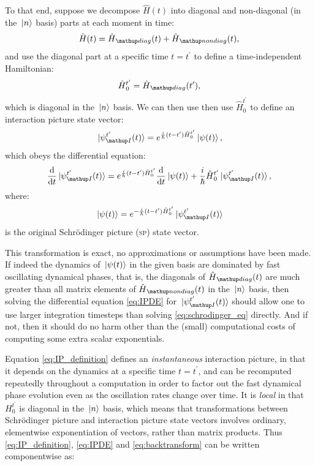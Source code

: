 To that end, suppose we decompose $\hat H(t)$ into diagonal and non-diagonal (in the $\ket{n}$ basis) parts at each moment in time:
\begin{align}
\hat H(t) = \hat H_\up{diag}(t) + \hat H_\up{nondiag}(t),
\end{align}
and use the diagonal part at a specific time $t=t^\prime$ to define a time-independent Hamiltonian:
\begin{align}\label{eq:H0def}
 \hat H_0^{t^\prime} = \hat H_\up{diag}(t^\prime),
\end{align}
which is diagonal in the $\ket{n}$ basis. We can then use then use $\hat H_0^{t^\prime}$ to define an interaction picture state vector:
\begin{align}\label{eq:IP_definition}
\ket{\psi_\up{I}^{t^\prime}(t)} = e^{\frac i \hbar (t - t^\prime) \hat H_0^{t^\prime}}\ket{\psi(t)},
\end{align}
which obeys the differential equation:
\begin{align}\label{eq:IPDE}
\dv t \ket{\psi_\up{I}^{t^\prime}(t)}
    = e^{\frac i \hbar (t - t^\prime) \hat H_0^{t^\prime}}\dv t \ket{\psi(t)}
      + \frac i\hbar \hat H_0^{t^\prime}\ket{\psi_\up{I}^{t^\prime}(t)},
\end{align}
where:
\begin{align}\label{eq:backtransform}
\ket{\psi(t)} = e^{-\frac i \hbar (t - t^\prime) \hat H_0^{t^\prime}}\ket{\psi_\up{I}^{t^\prime}(t)}
\end{align}
is the original Schrödinger picture (\textsc{sp}) state vector.

This transformation is exact, no approximations or assumptions have been made. If indeed the dynamics of $\ket{\psi(t)}$ in the given basis are dominated by fast oscillating dynamical phases, that is, the diagonals of $\hat H_\up{diag}(t)$ are much greater than all matrix elements of $\hat H_\up{nondiag}(t)$ in the $\ket{n}$ basis, then solving the differential equation \eqref{eq:IPDE} for $\ket{\psi_\up{I}^{t^\prime}(t)}$ should allow one to use larger integration timesteps than solving \eqref{eq:schrodinger_eq} directly. And if not, then it should do no harm other than the (small) computational costs of computing some extra scalar exponentials.

Equation \eqref{eq:IP_definition} defines an \emph{instantaneous} interaction picture, in that it depends on the dynamics at a specific time $t=t^\prime$, and can be recomputed repeatedly throughout a computation in order to factor out the fast dynamical phase evolution even as the oscillation rates change over time. It is \emph{local} in that $H_0^{t^\prime}$ is diagonal in the $\ket{n}$ basis, which means that transformations between Schrödinger picture and interaction picture state vectors involves ordinary, elementwise exponentiation of vectors, rather than matrix products. Thus \eqref{eq:IP_definition}, \eqref{eq:IPDE} and \eqref{eq:backtransform} can be written componentwise as:

